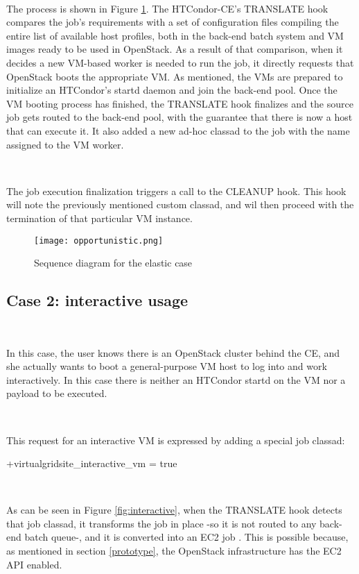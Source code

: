 \documentclass[a4paper]{jpconf}
\begin{document}
~

The process is shown in Figure \ref{fig:elastic}. 
The HTCondor-CE's TRANSLATE hook compares the job's requirements with a set of
configuration files compiling the entire list of available host profiles, 
both in the back-end batch system and VM images ready to be used in OpenStack.
As a result of that comparison, when it decides a new VM-based worker is needed
to run the job, it directly requests that OpenStack boots the appropriate VM.
As mentioned, the VMs are prepared to initialize an HTCondor's startd daemon and
join the back-end pool.
Once the VM booting process has finished, the TRANSLATE hook finalizes and the source job gets routed to the back-end pool,
with the guarantee that there is now a host that can execute it. 
It also added a new ad-hoc classad to the job with the name assigned to the VM
worker.

~

The job execution finalization triggers a call to the CLEANUP hook.
This hook will note the previously mentioned custom classad, and wil then
proceed with the termination of that particular VM instance.


\begin{figure}[h]
    \centering
    \texttt{[image: opportunistic.png]}
    \caption{Sequence diagram for the elastic case}
    \label{fig:elastic}
\end{figure}


\subsection{Case 2: interactive usage}

~

In this case, the user knows there is an OpenStack cluster behind the CE, 
and she actually wants to boot a general-purpose VM host to log into and work
interactively. 
In this case there is neither an HTCondor startd on the VM nor a payload to be executed.

~

This request for an interactive VM is expressed by adding a special job classad: 
\begin{center}
    +virtualgridsite\_interactive\_vm = true
\end{center}

~

As can be seen in Figure \ref{fig:interactive}, when the TRANSLATE hook detects that job classad, 
it transforms the job in place -so it is not routed to any back-end batch
queue-, and it is converted into an EC2 job \cite{condorec2}.
This is possible because, as mentioned in section \ref{prototype}, the OpenStack infrastructure has the EC2 API enabled. 
\end{document}
